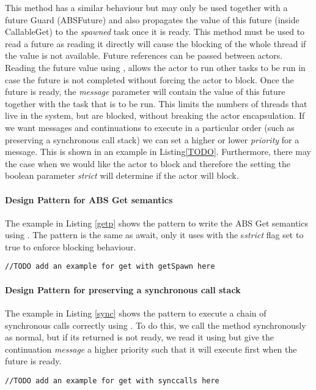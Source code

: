 This method has a similar behaviour \spawn but may only be used together with a future Guard (ABSFuture) and also propagates the value of this future (inside CallableGet) to the \textit{spawned} task once it is ready. This method must be used to read a future as reading it directly will cause the blocking of the whole thread if the value is not available.  Future references can be passed between actors. Reading the future value using \gspawn, allows the actor to run other tasks to be run in case the future is not completed without forcing the actor to block. Once the future is ready, the \textit{message} parameter will contain the value of this future together with the task that is to be run. This limits the numbers of threads that live in the system, but are blocked, without breaking the actor encapsulation. If we want messages and continuations to execute in a particular order (such as preserving a synchronous call stack) we can set a higher or lower \textit{priority} for a message. This is shown in an example in Listing\ref{TODO}. Furthermore, there may the case when we would like the actor to block and therefore the setting the boolean parameter \textit{strict} will determine if the actor will block.  

\paragraph{Design Pattern for ABS Get semantics}
The example in Listing \ref{getp} shows the pattern to write the ABS Get semantics using \gspawn. The pattern is the same as await, only it uses \gspawn with the s\textit{strict} flag set to true to enforce blocking behaviour.
\begin{lstlisting}[label=getdp]
//TODO add an example for get with getSpawn here
\end{lstlisting}

\paragraph{Design Pattern for preserving a synchronous call stack}
The example in Listing \ref{sync} shows the pattern to execute a chain of synchronous calls correctly using \gspawn. To do this, we call the method synchronously as normal, but if its returned \future is not ready, we read it using \gspawn but give the continuation \textit{message} a higher priority such that it will execute first when the future is ready.
\begin{lstlisting}[label=syncdp]
//TODO add an example for get with synccalls here
\end{lstlisting}


